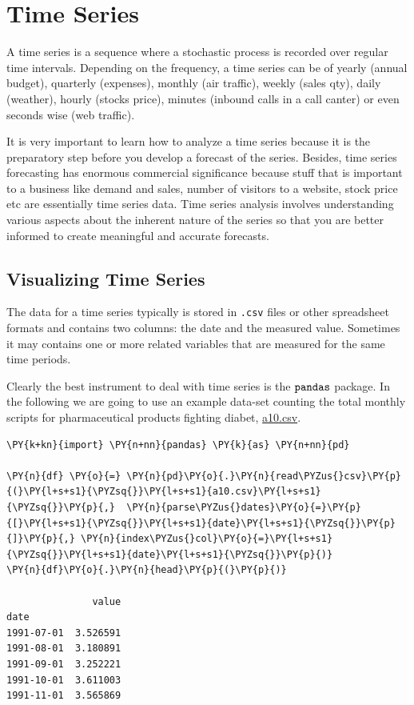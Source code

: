 \chapter{Time Series}\label{time-series}

A time series is a sequence where a stochastic process is recorded over
regular time intervals.
Depending on the frequency, a time series can be of yearly (annual
budget), quarterly (expenses), monthly (air traffic), weekly (sales
qty), daily (weather), hourly (stocks price), minutes (inbound calls in
a call canter) or even seconds wise (web traffic).

It is very important to learn how to analyze a time series because it is
the preparatory step before you develop a forecast of the series.
Besides, time series forecasting has enormous commercial significance
because stuff that is important to a business like demand and sales,
number of visitors to a website, stock price etc are essentially time
series data. Time series analysis involves understanding various aspects
about the inherent nature of the series so that you are better informed
to create meaningful and accurate forecasts.

\section{Visualizing Time Series}\label{visualizing-time-series}

The data for a time series typically is stored in \texttt{.csv} files or other
spreadsheet formats and contains two columns: the date and the measured
value. Sometimes it may contains one or more related variables that are
measured for the same time periods.

Clearly the best instrument to deal with time series is the
\(\tt{pandas}\) package. In the following we are going to use an example
data-set counting the total monthly scripts for pharmaceutical products
fighting diabet, \href{here}{a10.csv}.

\begin{codebox}[breakable, size=fbox, boxrule=1pt, pad at break*=1mm,colback=cellbackground, colframe=cellborder]
\begin{Verbatim}[commandchars=\\\{\}]
\PY{k+kn}{import} \PY{n+nn}{pandas} \PY{k}{as} \PY{n+nn}{pd}

\PY{n}{df} \PY{o}{=} \PY{n}{pd}\PY{o}{.}\PY{n}{read\PYZus{}csv}\PY{p}{(}\PY{l+s+s1}{\PYZsq{}}\PY{l+s+s1}{a10.csv}\PY{l+s+s1}{\PYZsq{}}\PY{p}{,}  \PY{n}{parse\PYZus{}dates}\PY{o}{=}\PY{p}{[}\PY{l+s+s1}{\PYZsq{}}\PY{l+s+s1}{date}\PY{l+s+s1}{\PYZsq{}}\PY{p}{]}\PY{p}{,} \PY{n}{index\PYZus{}col}\PY{o}{=}\PY{l+s+s1}{\PYZsq{}}\PY{l+s+s1}{date}\PY{l+s+s1}{\PYZsq{}}\PY{p}{)}
\PY{n}{df}\PY{o}{.}\PY{n}{head}\PY{p}{(}\PY{p}{)}

               value
date
1991-07-01  3.526591
1991-08-01  3.180891
1991-09-01  3.252221
1991-10-01  3.611003
1991-11-01  3.565869
\end{Verbatim}
\end{codebox}
        
